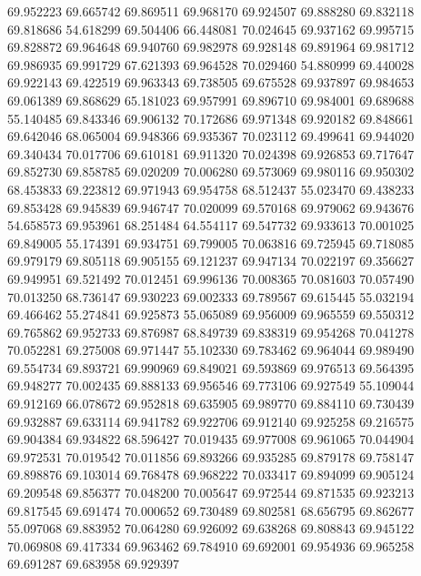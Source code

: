 69.952223
69.665742
69.869511
69.968170
69.924507
69.888280
69.832118
69.818686
54.618299
69.504406
66.448081
70.024645
69.937162
69.995715
69.828872
69.964648
69.940760
69.982978
69.928148
69.891964
69.981712
69.986935
69.991729
67.621393
69.964528
70.029460
54.880999
69.440028
69.922143
69.422519
69.963343
69.738505
69.675528
69.937897
69.984653
69.061389
69.868629
65.181023
69.957991
69.896710
69.984001
69.689688
55.140485
69.843346
69.906132
70.172686
69.971348
69.920182
69.848661
69.642046
68.065004
69.948366
69.935367
70.023112
69.499641
69.944020
69.340434
70.017706
69.610181
69.911320
70.024398
69.926853
69.717647
69.852730
69.858785
69.020209
70.006280
69.573069
69.980116
69.950302
68.453833
69.223812
69.971943
69.954758
68.512437
55.023470
69.438233
69.853428
69.945839
69.946747
70.020099
69.570168
69.979062
69.943676
54.658573
69.953961
68.251484
64.554117
69.547732
69.933613
70.001025
69.849005
55.174391
69.934751
69.799005
70.063816
69.725945
69.718085
69.979179
69.805118
69.905155
69.121237
69.947134
70.022197
69.356627
69.949951
69.521492
70.012451
69.996136
70.008365
70.081603
70.057490
70.013250
68.736147
69.930223
69.002333
69.789567
69.615445
55.032194
69.466462
55.274841
69.925873
55.065089
69.956009
69.965559
69.550312
69.765862
69.952733
69.876987
68.849739
69.838319
69.954268
70.041278
70.052281
69.275008
69.971447
55.102330
69.783462
69.964044
69.989490
69.554734
69.893721
69.990969
69.849021
69.593869
69.976513
69.564395
69.948277
70.002435
69.888133
69.956546
69.773106
69.927549
55.109044
69.912169
66.078672
69.952818
69.635905
69.989770
69.884110
69.730439
69.932887
69.633114
69.941782
69.922706
69.912140
69.925258
69.216575
69.904384
69.934822
68.596427
70.019435
69.977008
69.961065
70.044904
69.972531
70.019542
70.011856
69.893266
69.935285
69.879178
69.758147
69.898876
69.103014
69.768478
69.968222
70.033417
69.894099
69.905124
69.209548
69.856377
70.048200
70.005647
69.972544
69.871535
69.923213
69.817545
69.691474
70.000652
69.730489
69.802581
68.656795
69.862677
55.097068
69.883952
70.064280
69.926092
69.638268
69.808843
69.945122
70.069808
69.417334
69.963462
69.784910
69.692001
69.954936
69.965258
69.691287
69.683958
69.929397
